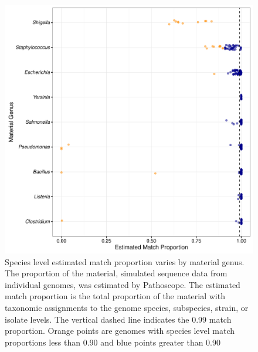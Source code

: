 \documentclass[fleqn,10pt,lineno]{wlpeerj}\usepackage[]{graphicx}\usepackage[]{color}
\makeatletter
\def\maxwidth{ %
  \ifdim\Gin@nat@width>\linewidth
    \linewidth
  \else
    \Gin@nat@width
  \fi
}
\newenvironment{knitrout}{}{} %
\makeatother
\begin{document}
\begin{knitrout}
\color{fgcolor}\begin{figure}
\includegraphics[width=\maxwidth]{figure/species_prop-1} \caption[Species level estimated match proportion varies by material genus]{Species level estimated match proportion varies by material genus. The proportion of the material, simulated sequence data from individual genomes, was estimated by Pathoscope. The estimated match proportion is the total proportion of the material with taxonomic assignments to the genome species, subspecies, strain, or isolate levels. The vertical dashed line indicates the 0.99 match proportion. Orange points are genomes with species level match proportions less than 0.90 and blue points greater than 0.90}\label{fig:species_prop}
\end{figure}


\end{knitrout}
\end{document}
